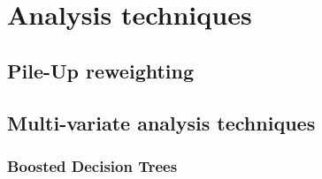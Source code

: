 \chapter{Analysis techniques}

\section{Pile-Up reweighting}
\label{sec:pile-up}

\section{Multi-variate analysis techniques}
\subsection{Boosted Decision Trees}
\label{sec:BDT}